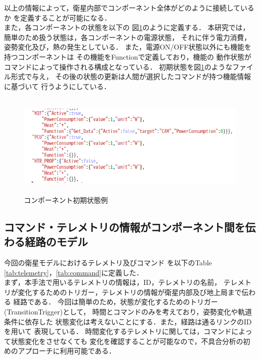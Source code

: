 \documentclass[11pt]{jsreport}
\begin{document}
以上の情報によって，衛星内部でコンポーネント全体がどのように接続しているか
を定義することが可能になる．\\
また，各コンポーネントの状態を以下の
図\ref{fig:Compo_state}のように定義する．
本研究では，簡単のため扱う状態は，各コンポーネントの電源状態，
それに伴う電力消費，姿勢変化及び，熱の発生としている．
また，電源ON/OFF状態以外にも機能を持つコンポーネントは
その機能をFunctionで定義しており，機能の
動作状態がコマンドによって操作される構成となっている．
初期状態を図\ref{fig:Compo_state}のようなファイル形式で与え，
その後の状態の更新は人間が選択したコマンドが持つ機能情報に基づいて
行うようにしている．
\begin{figure}[H]
   \centering
      \includegraphics[height=5.0cm]{figure/Component_state.png}
      \caption{コンポーネント初期状態例}
      \label{fig:Compo_state}
\end{figure}

\subsection{コマンド・テレメトリの情報がコンポーネント間を伝わる経路のモデル}
今回の衛星モデルにおけるテレメトリ及びコマンド
を以下のTable \ref{tab:telemetry}，\ref{tab:command}に定義した．\\
まず，本手法で用いるテレメトリの情報は，ID，テレメトリの名前，
テレメトリが変化するためのトリガー，テレメトリの情報が衛星内部及び地上局まで伝わる
経路である．
今回は簡単のため，状態が変化するためのトリガー(TransitionTrigger)として，
時間とコマンドのみを考えており，姿勢変化や軌道条件に依存した
状態変化は考えないことにする．また，経路は通るリンクのIDを用いて
表現している．
時間変化するテレメトリに関しては，コマンドによって状態変化をさせなくても
変化を確認することが可能なので，不具合分析の初めのアプローチに利用可能である．
\end{document}

